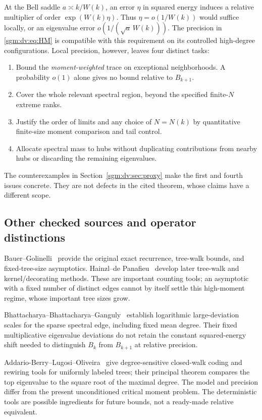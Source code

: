 \documentclass[11pt,letterpaper]{article}
\theoremstyle{remark}\newtheorem{remark}[theorem]{Remark}
\theoremstyle{definition}\newtheorem{definition}[theorem]{Definition}
\begin{document}
At the Bell saddle $a\asymp k/W(k)$, an error $\eta$ in squared energy induces a relative multiplier of order $\exp(W(k)\eta)$. Thus $\eta=o(1/W(k))$ would suffice locally, or an eigenvalue error $o(1/(\sqrt a\,W(k)))$. The precision in \eqref{sgm:dv:eq:HM} is compatible with this requirement on its controlled high-degree configurations. Local precision, however, leaves four distinct tasks:
\begin{enumerate}
\item Bound the \emph{moment-weighted} trace on exceptional neighborhoods. A probability $o(1)$ alone gives no bound relative to $B_{k+1}$.
\item Cover the whole relevant spectral region, beyond the specified finite-$N$ extreme ranks.
\item Justify the order of limits and any choice of $N=N(k)$ by quantitative finite-size moment comparison and tail control.
\item Allocate spectral mass to hubs without duplicating contributions from nearby hubs or discarding the remaining eigenvalues.
\end{enumerate}
The counterexamples in Section~\ref{sgm:dv:sec:proxy} make the first and fourth issues concrete. They are not defects in the cited theorem, whose claims have a different scope.

\subsection{Other checked sources and operator distinctions}
Bauer--Golinelli~\cite{bg} provide the original exact recurrence, tree-walk bounds, and fixed-tree-size asymptotics. Hainzl--de Panafieu~\cite{hdp} develop later tree-walk and kernel/decorating methods. These are important counting tools; an asymptotic with a fixed number of distinct edges cannot by itself settle this high-moment regime, whose important tree sizes grow.

Bhattacharya--Bhattacharya--Ganguly~\cite[Theorems 1.1--1.2]{bbg} establish logarithmic large-deviation scales for the sparse spectral edge, including fixed mean degree. Their fixed multiplicative eigenvalue deviations do not retain the constant squared-energy shift needed to distinguish $B_k$ from $B_{k+1}$ at relative precision.

Addario-Berry--Lugosi--Oliveira~\cite{ablo} give degree-sensitive closed-walk coding and rewiring tools for uniformly labeled trees; their principal theorem compares the top eigenvalue to the square root of the maximal degree. The model and precision differ from the present unconditioned critical moment problem. The deterministic tools are possible ingredients for future bounds, not a ready-made relative equivalent.
\end{document}
